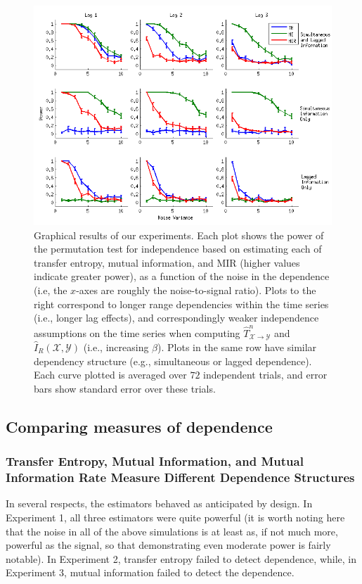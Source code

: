 \documentclass{article} %
\newcommand{\X}{\mathcal{X}}                        %
\newcommand{\Y}{\mathcal{Y}}                        %
\renewcommand{\hat}{\widehat}
\begin{document}
\begin{figure}[ht]
\centering
\includegraphics[width=\textwidth,clip=true,trim=3mm 3mm 0mm 0mm]{final_all}
\caption{Graphical results of our experiments. Each plot shows the power of the
permutation test for independence based on estimating each of transfer entropy,
mutual information, and MIR (higher values indicate greater power), as a
function of the noise in the dependence (i.e, the $x$-axes are roughly the
noise-to-signal ratio). Plots to the right correspond to longer range
dependencies within the time series (i.e., longer lag effects), and
correspondingly weaker independence assumptions on the time series when
computing $\hat T_{\X \to \Y}^n$ and $\hat I_R(\X,\Y)$ (i.e., increasing
$\beta$). Plots in the same row have similar dependency structure (e.g.,
simultaneous or lagged dependence). Each curve plotted is averaged over $72$
independent trials, and error bars show standard error over these trials.}
\label{fig:results}
\end{figure}

\subsection{Comparing measures of dependence}
\subsubsection{Transfer Entropy, Mutual Information, and Mutual Information
Rate Measure Different Dependence Structures}
In several respects, the estimators behaved as anticipated by design. In
Experiment 1, all three estimators were quite powerful (it is worth noting
here that the noise in all of the above simulations is at least as, if not much
more, powerful as the signal, so that demonstrating even moderate power is
fairly notable). In Experiment 2, transfer entropy failed to detect dependence,
while, in Experiment 3, mutual information failed to detect the dependence.
\end{document}
